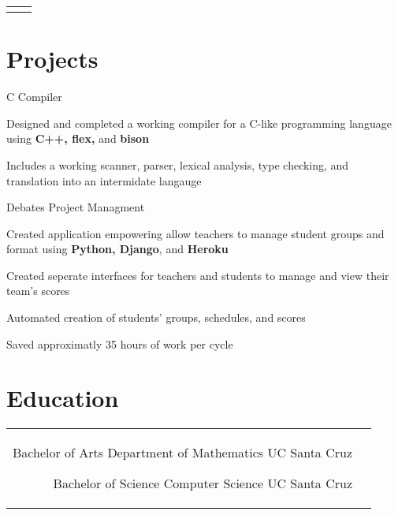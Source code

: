 \documentclass[10pt]{article}
\begin{document}
\begin{paracol}{2}
\begin{supertabular}{rl}

\end{supertabular}


\switchcolumn

\section{Projects}

{}{}
{C Compiler}{}
{
  \item Designed and completed a working compiler for a C-like programming language
    using \textbf{C++, flex,} and \textbf{bison}
  \item Includes a working scanner, parser, lexical analysis, type checking,
    and translation in\-to an intermidate langauge
}

{}{}
{Debates Project Managment}{}
{
  \item Created application empowering allow teachers to manage
    student groups and format using \textbf{Python, Django},
    and \textbf{Heroku}
  \item Created seperate interfaces for teachers and students to
    manage and view their team's scores
  \item Automated creation of students' groups, sche\-dules, and scores
  \item Saved approximatly 35 hours of work per cycle
}

\section{Education}

\begin{supertabular}{rl}
	{Bachelor of Arts}
	{}
    {Department of Mathematics}
	{UC Santa Cruz}

    {Bachelor of Science}
    {}
    {Computer Science}
    {UC Santa Cruz}

\end{supertabular}

\end{paracol}
\end{document}
